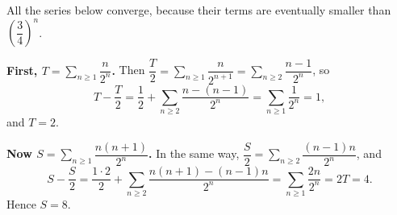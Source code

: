 All the series below converge, because their terms are eventually smaller than $\left(\dfrac34\right)^n$.

\textbf{First, $T=\displaystyle\sum_{n\ge1}\dfrac{n}{2^n}$.} Then $\dfrac T2=\displaystyle\sum_{n\ge1}\dfrac{n}{2^{n+1}}=\sum_{n\ge2}\dfrac{n-1}{2^n}$, so
\[T-\dfrac T2=\dfrac12+\sum_{n\ge2}\dfrac{n-(n-1)}{2^n}=\sum_{n\ge1}\dfrac1{2^n}=1,\]
and $T=2$.

\textbf{Now $S=\displaystyle\sum_{n\ge1}\dfrac{n(n+1)}{2^n}$.} In the same way, $\dfrac S2=\displaystyle\sum_{n\ge2}\dfrac{(n-1)n}{2^n}$, and
\[S-\dfrac S2=\dfrac{1\cdot2}{2}+\sum_{n\ge2}\dfrac{n(n+1)-(n-1)n}{2^n}=\sum_{n\ge1}\dfrac{2n}{2^n}=2T=4.\]
Hence $S=\boxed{8}$.

